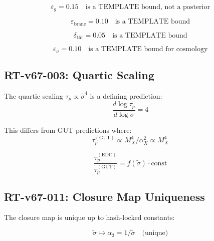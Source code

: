 \documentclass[11pt,letterpaper]{article}
\newcommand{\st}{\tilde{\sigma}}
\newcommand{\eps}{\varepsilon}
\begin{document}
\begin{equation}
\eps_g = 0.15 \quad \text{is a TEMPLATE bound, not a posterior}
\label{eq:eps-g-clarify}
\end{equation}

\begin{equation}
\eps_{\text{brane}} = 0.10 \quad \text{is a TEMPLATE bound}
\label{eq:eps-brane-clarify}
\end{equation}

\begin{equation}
\delta_{\text{thr}} = 0.05 \quad \text{is a TEMPLATE bound}
\label{eq:delta-thr-clarify}
\end{equation}

\begin{equation}
\eps_\sigma = 0.10 \quad \text{is a TEMPLATE bound for cosmology}
\label{eq:eps-sigma-clarify}
\end{equation}

\subsection{RT-v67-003: Quartic Scaling}
\label{app:rt003}

The quartic scaling $\tau_p \propto \st^4$ is a defining prediction:
\begin{equation}
\frac{d \log \tau_p}{d \log \st} = 4
\label{eq:quartic-log}
\end{equation}

This differs from GUT predictions where:
\begin{equation}
\tau_p^{(\text{GUT})} \propto M_X^4 / \alpha_X^2 \propto M_X^4
\label{eq:gut-scaling}
\end{equation}

\begin{equation}
\frac{\tau_p^{(\text{EDC})}}{\tau_p^{(\text{GUT})}} = f(\st) \cdot \text{const}
\label{eq:edc-vs-gut}
\end{equation}

\subsection{RT-v67-011: Closure Map Uniqueness}
\label{app:rt011}

The closure map is unique up to hash-locked constants:

\begin{equation}
\st \mapsto \alpha_3 = 1/\st \quad \text{(unique)}
\label{eq:map-alpha3}
\end{equation}
\end{document}
